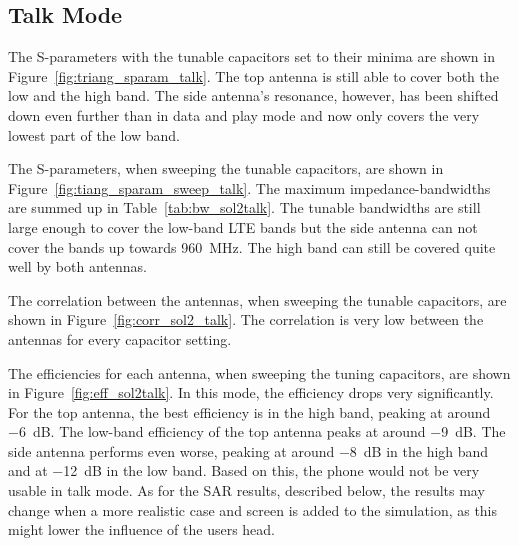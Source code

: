 \FloatBarrier
\subsection{Talk Mode}

The S-parameters with the tunable capacitors set to their minima are shown in Figure~\ref{fig:triang_sparam_talk}. The top antenna is still able to cover both the low and the high band. The side antenna's resonance, however, has been shifted down even further than in data and play mode and now only covers the very lowest part of the low band.

The S-parameters, when sweeping the tunable capacitors, are shown in Figure~\ref{fig:tiang_sparam_sweep_talk}. The maximum impedance-bandwidths are summed up in Table~\ref{tab:bw_sol2talk}. The tunable bandwidths are still large enough to cover the low-band LTE bands but the side antenna can not cover the bands up towards \SI{960}{MHz}. The high band can still be covered quite well by both antennas.

The correlation between the antennas, when sweeping the tunable capacitors, are shown in Figure~\ref{fig:corr_sol2_talk}. The correlation is very low between the antennas for every capacitor setting.

The efficiencies for each antenna, when sweeping the tuning capacitors, are shown in Figure~\ref{fig:eff_sol2talk}. In this mode, the efficiency drops very significantly. For the top antenna, the best efficiency is in the high band, peaking at around \SI{-6}{dB}. The low-band efficiency of the top antenna peaks at around \SI{-9}{dB}. The side antenna performs even worse, peaking at around \SI{-8}{dB} in the high band and at \SI{-12}{dB} in the low band. Based on this, the phone would not be very usable in talk mode. As for the SAR results, described below, the results may change when a more realistic case and screen is added to the simulation, as this might lower the influence of the users head.

